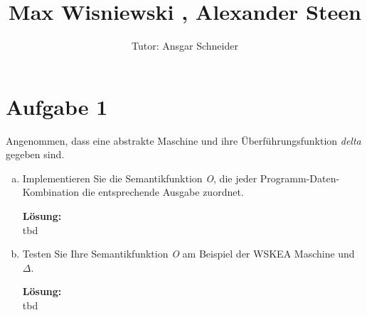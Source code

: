 \documentclass[11pt,a4paper,ngerman]{article}
\author{Tutor: Ansgar Schneider}
\date{}
\title{Max Wisniewski , Alexander Steen}
\begin{document}

\maketitle
\thispagestyle{fancy}



\section*{Aufgabe 1}

Angenommen, dass eine abstrakte Maschine und ihre Überführungsfunktion \emph{delta} gegeben sind.

\begin{enumerate}[a)]
    \item   Implementieren Sie die Semantikfunktion \emph{O}, die jeder Programm-Daten-Kombination
            die entsprechende Ausgabe zuordnet.

            \textbf{Lösung:}\\
            tbd

    \item   Testen Sie Ihre Semantikfunktion \emph{O} am Beispiel der WSKEA Maschine und $\Delta$.
    
            \textbf{Lösung:}\\
            tbd
\end{enumerate}
\end{document}
